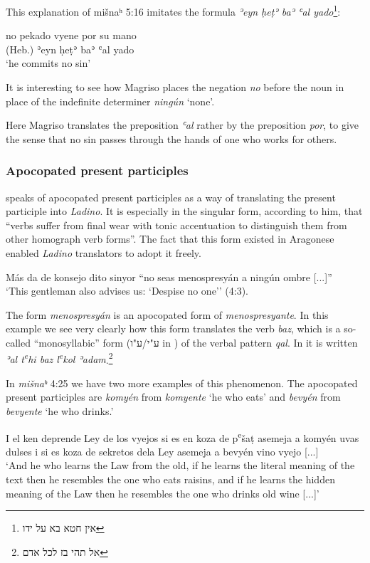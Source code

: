 \documentclass[output=paper,colorlinks,citecolor=brown,babel,arabicfont]{langscibook}
\begin{document}
This explanation of mišnaʰ 5:16 imitates the  formula \textit{ʾeyn ḥeṭʾ baʾ ʿal yado}\footnote{\texthebrew{אין חטא בא על ידו}}:

\ea\label{ch3.7.ex.n37}
no pekado vyene por su mano \\
(Heb.) ʾeyn ḥeṭʾ baʾ ʿal yado \\
`he commits no sin'
\z

It is interesting to see how Magriso places the negation \textit{no} before the noun in place of the indefinite determiner \textit{ningún} `none'. 

Here Magriso translates the preposition \textit{ʿal} rather by the preposition \textit{por}, to give the sense that no sin passes through the hands of one who works for others.  

\subsubsection{Apocopated present participles}\label{ch3.7.ss.3.3.2}

\citet[51--53]{sephiha1973} speaks of apocopated present participles as a way of translating the  present participle into \textit{Ladino}. It is especially in the singular form, according to him, that ``verbs suffer from final wear with tonic accentuation to distinguish them from other homograph verb forms''. The fact that this form existed in Aragonese enabled \textit{Ladino} translators to adopt it freely. 

\ea\label{ch3.7.ex.n38} 
Más da de konsejo dito sinyor ``no seas menospresyán a ningún ombre {[...]}'' \\
`This gentleman also advises us: `Despise no one'' (4:3).
\z

The form \textit{menospresyán} is an apocopated form of \textit{menospresyante}. In this example we see very clearly how this form translates the  verb \textit{baz}, which is a so-called ``monosyllabic'' form (\texthebrew{ע"י/ע"ו} in ) of the verbal pattern \textit{qal}. In  it is written \textit{ʾal t\textsuperscript{e}hi baz l\textsuperscript{e}kol ʾadam}.\footnote{\texthebrew{אל תהי בז לכל אדם}} 

In \textit{mišnaʰ} 4:25 we have two more examples of this phenomenon. The apocopated present participles are \textit{komyén} from \textit{komyente} `he who eats' and \textit{bevyén} from \textit{bevyente} `he who drinks.'

\ea\label{ch3.7.ex.n39}
I el ken deprende Ley de los vyejos si es en koza de p\textsuperscript{e}šaṭ asemeja a komyén uvas dulses i si es koza de sekretos dela Ley asemeja a bevyén vino vyejo {[...]} \\
`And he who learns the Law from the old, if he learns the literal meaning of the text then he resembles the one who eats raisins, and if he learns the hidden meaning of the Law then he resembles the one who drinks old wine {[...]}' \\
\z
\end{document}
